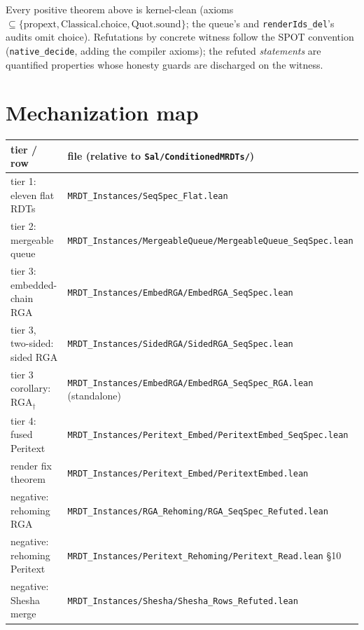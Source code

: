\documentclass[11pt]{article}
\newcommand{\code}[1]{\texttt{#1}}
\begin{document}
\noindent Every positive theorem above is kernel-clean (axioms
$\subseteq \{\mathrm{propext}, \mathrm{Classical.choice},
\mathrm{Quot.sound}\}$; the queue's and \code{renderIds\_del}'s audits
omit choice). Refutations by concrete witness follow the SPOT
convention (\code{native\_decide}, adding the compiler axioms); the
refuted \emph{statements} are quantified properties whose honesty
guards are discharged on the witness.

\section{Mechanization map}
\label{sec:map}

\begin{center}\small
\begin{tabular}{@{}ll@{}}
\toprule
tier / row & file (relative to \code{Sal/ConditionedMRDTs/}) \\
\midrule
tier 1: eleven flat RDTs & \code{MRDT\_Instances/SeqSpec\_Flat.lean} \\
tier 2: mergeable queue &
  \code{MRDT\_Instances/MergeableQueue/MergeableQueue\_SeqSpec.lean} \\
tier 3: embedded-chain RGA &
  \code{MRDT\_Instances/EmbedRGA/EmbedRGA\_SeqSpec.lean} \\
tier 3, two-sided: sided RGA &
  \code{MRDT\_Instances/SidedRGA/SidedRGA\_SeqSpec.lean} \\
tier 3 corollary: RGA$_\dagger$ &
  \code{MRDT\_Instances/EmbedRGA/EmbedRGA\_SeqSpec\_RGA.lean}
  (standalone) \\
tier 4: fused Peritext &
  \code{MRDT\_Instances/Peritext\_Embed/PeritextEmbed\_SeqSpec.lean} \\
render fix theorem &
  \code{MRDT\_Instances/Peritext\_Embed/PeritextEmbed.lean} \\
negative: rehoming RGA &
  \code{MRDT\_Instances/RGA\_Rehoming/RGA\_SeqSpec\_Refuted.lean} \\
negative: rehoming Peritext &
  \code{MRDT\_Instances/Peritext\_Rehoming/Peritext\_Read.lean} \S10 \\
negative: Shesha merge &
  \code{MRDT\_Instances/Shesha/Shesha\_Rows\_Refuted.lean} \\
\bottomrule
\end{tabular}
\end{center}
\end{document}
